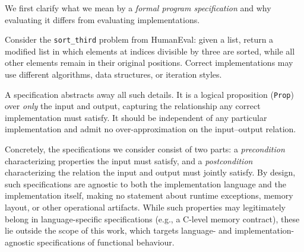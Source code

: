 \label{sec:motivation}

We first clarify what we mean by a \emph{formal program specification}
and why evaluating it differs from evaluating implementations.

Consider the \texttt{sort\_third} problem from HumanEval:
given a list, return a modified list in which elements at indices
divisible by three are sorted, while all other elements remain
in their original positions.
Correct implementations may use different algorithms, data structures,
or iteration styles.

A specification abstracts away all such details.
It is a logical proposition (\texttt{Prop}) over \emph{only} the input
and output, capturing the relationship any correct implementation must satisfy.
It should be independent of any particular implementation
and admit no over-approximation on the input--output relation.


Concretely, the specifications we consider consist of two parts: a \emph{precondition} characterizing properties the input must satisfy, and a \emph{postcondition} characterizing the relation the input and output must jointly satisfy. By design, such specifications are agnostic to both the implementation language and the implementation itself, making no statement about runtime exceptions, memory layout, or other operational artifacts. While such properties may legitimately belong in language-specific specifications (e.g., a C-level memory contract), these lie outside the scope of this work, which targets language- and implementation-agnostic specifications of functional behaviour.

